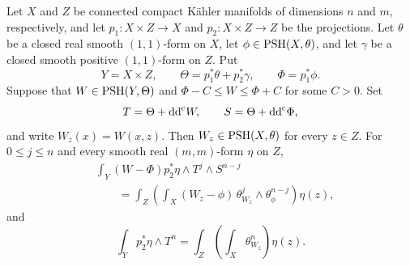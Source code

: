 \begin{corollary}\label{cor:compactfibreslicing}
    Let $X$ and $Z$ be connected compact Kähler manifolds of dimensions $n$ and $m$, respectively, and let $p_1\colon X\times Z\to X$ and $p_2\colon X\times Z\to Z$ be the projections. Let $\theta$ be a closed real smooth $(1,1)$-form on $X$, let $\phi\in\mathrm{PSH}(X,\theta)$, and let $\gamma$ be a closed smooth positive $(1,1)$-form on $Z$. Put
    \[
        Y=X\times Z,\qquad
        \Theta=p_1^*\theta+p_2^*\gamma,\qquad
        \Phi=p_1^*\phi.
    \]
    Suppose that $W\in\mathrm{PSH}(Y,\Theta)$ and $\Phi-C\leq W\leq\Phi+C$ for some $C>0$. Set
    \[
        T=\Theta+\mathrm{dd}^{\mathrm{c}} W,\qquad S=\Theta+\mathrm{dd}^{\mathrm{c}}\Phi,
    \]
    and write $W_z(x)=W(x,z)$. Then $W_z\in\mathrm{PSH}(X,\theta)$ for every $z\in Z$. For $0\leq j\leq n$ and every smooth real $(m,m)$-form $\eta$ on $Z$,
    \begin{equation}\label{eq:compactrelativeenergyslicing}
        \begin{aligned}
        &\int_Y(W-\Phi)p_2^*\eta\wedge T^j\wedge S^{n-j}\\
        &\qquad=\int_Z\left(\int_X(W_z-\phi)\,
        \theta_{W_z}^j\wedge\theta_\phi^{n-j}\right)\eta(z),
        \end{aligned}
    \end{equation}
    and
    \begin{equation}\label{eq:compactfibreslicingconstant}
        \int_Y p_2^*\eta\wedge T^n
        =\int_Z\left(\int_X\theta_{W_z}^n\right)\eta(z).
    \end{equation}
\end{corollary}
